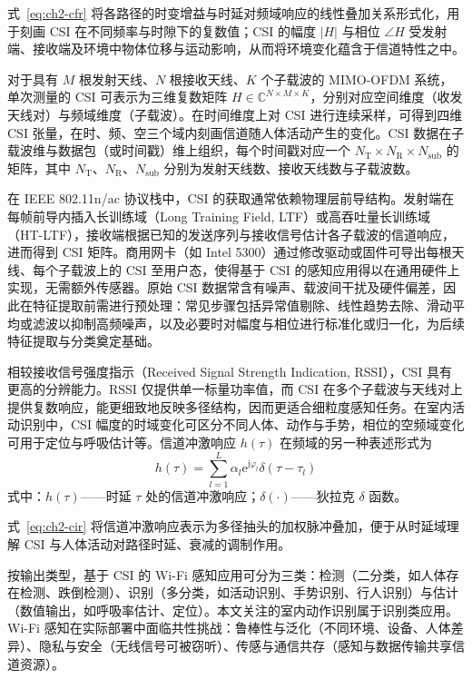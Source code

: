 式~\eqref{eq:ch2-cfr} 将各路径的时变增益与时延对频域响应的线性叠加关系形式化，用于刻画 CSI 在不同频率与时隙下的复数值；CSI 的幅度 $|H|$ 与相位 $\angle H$ 受发射端、接收端及环境中物体位移与运动影响，从而将环境变化蕴含于信道特性之中。

对于具有 $M$ 根发射天线、$N$ 根接收天线、$K$ 个子载波的 MIMO-OFDM 系统，单次测量的 CSI 可表示为三维复数矩阵 $H \in \mathbb{C}^{N \times M \times K}$，分别对应空间维度（收发天线对）与频域维度（子载波）。在时间维度上对 CSI 进行连续采样，可得到四维 CSI 张量，在时、频、空三个域内刻画信道随人体活动产生的变化。CSI 数据在子载波维与数据包（或时间戳）维上组织，每个时间戳对应一个 $N_{\mathrm{T}} \times N_{\mathrm{R}} \times N_{\mathrm{sub}}$ 的矩阵，其中 $N_{\mathrm{T}}$、$N_{\mathrm{R}}$、$N_{\mathrm{sub}}$ 分别为发射天线数、接收天线数与子载波数。

在 IEEE 802.11n/ac 协议栈中，CSI 的获取通常依赖物理层前导结构。发射端在每帧前导内插入长训练域（Long Training Field, LTF）或高吞吐量长训练域（HT-LTF），接收端根据已知的发送序列与接收信号估计各子载波的信道响应，进而得到 CSI 矩阵。商用网卡（如 Intel 5300）通过修改驱动或固件可导出每根天线、每个子载波上的 CSI 至用户态，使得基于 CSI 的感知应用得以在通用硬件上实现，无需额外传感器。原始 CSI 数据常含有噪声、载波间干扰及硬件偏差，因此在特征提取前需进行预处理：常见步骤包括异常值剔除、线性趋势去除、滑动平均或滤波以抑制高频噪声，以及必要时对幅度与相位进行标准化或归一化，为后续特征提取与分类奠定基础。

相较接收信号强度指示（Received Signal Strength Indication, RSSI），CSI 具有更高的分辨能力。RSSI 仅提供单一标量功率值，而 CSI 在多个子载波与天线对上提供复数响应，能更细致地反映多径结构，因而更适合细粒度感知任务。在室内活动识别中，CSI 幅度的时域变化可区分不同人体、动作与手势，相位的空频域变化可用于定位与呼吸估计等\cite{ma2019wifi}。信道冲激响应 $h(\tau)$ 在频域的另一种表述形式为
\begin{equation}\label{eq:ch2-cir}
  h(\tau) = \sum_{l=1}^{L} \alpha_l \mathrm{e}^{\mathrm{j}\varphi_l} \delta(\tau - \tau_l)
  \tag{2-2}
\end{equation}
\noindent 式中：$h(\tau)$——时延 $\tau$ 处的信道冲激响应；$\delta(\cdot)$——狄拉克 $\delta$ 函数。

式~\eqref{eq:ch2-cir} 将信道冲激响应表示为多径抽头的加权脉冲叠加，便于从时延域理解 CSI 与人体活动对路径时延、衰减的调制作用。

按输出类型，基于 CSI 的 Wi-Fi 感知应用可分为三类：检测（二分类，如人体存在检测、跌倒检测）、识别（多分类，如活动识别、手势识别、行人识别）与估计（数值输出，如呼吸率估计、定位）\cite{ma2019wifi}。本文关注的室内动作识别属于识别类应用。Wi-Fi 感知在实际部署中面临共性挑战：鲁棒性与泛化（不同环境、设备、人体差异）、隐私与安全（无线信号可被窃听）、传感与通信共存（感知与数据传输共享信道资源）\cite{ma2019wifi}。

